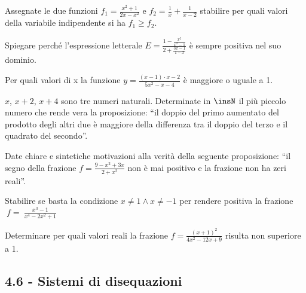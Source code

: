 \begin{esercizio}[\Ast]
 \label{ese:4.68}
Assegnate le due funzioni $f_1=\frac{x^2+1}{2x-x^2}$ e $f_2=\frac 1 x+\frac 1{x-2}$ stabilire per quali valori della variabile indipendente si ha $f_1\ge f_2$.
\end{esercizio}

\begin{esercizio}
 \label{ese:4.69}
Spiegare perché l'espressione letterale $E=\frac{1-\frac{x^2}{x^2-1}}{2+\frac{3x-1}{1-x}}$ è sempre positiva nel suo dominio.
\end{esercizio}

\begin{esercizio}[\Ast]
 \label{ese:4.70}
Per quali valori di x la funzione $y=\frac{(x-1)\cdot x-2}{5x^2-x-4}$ è maggiore o uguale a 1.
\end{esercizio}

\begin{esercizio}[\Ast]
 \label{ese:4.71}
$ x $, $ x+2 $, $ x+4 $ sono tre numeri naturali. Determinate in $ \insN $ il più piccolo numero che rende vera la proposizione: ``il doppio del primo aumentato del prodotto degli altri due è maggiore della differenza tra il doppio del terzo e il quadrato del secondo''.
\end{esercizio}

\begin{esercizio}
 \label{ese:4.72}
Date chiare e sintetiche motivazioni alla verità della seguente proposizione: “il segno della frazione $f=\frac{9-x^2+3x}{2+x^2}$ non è mai positivo e la frazione non ha zeri reali”.
\end{esercizio}

\begin{esercizio}
 \label{ese:4.73}
Stabilire se basta la condizione $x\neq 1\wedge x\neq -1$ per rendere positiva la frazione $~f=~\frac{x^3-1}{x^4-2x^2+1}$
\end{esercizio}

\begin{esercizio}
 \label{ese:4.74}
Determinare per quali valori reali la frazione $f=\frac{(x+1)^2}{4x^2-12x+9}$ risulta non superiore a 1.
\end{esercizio}

\pagebreak
\subsection*{4.6 - Sistemi di disequazioni}

